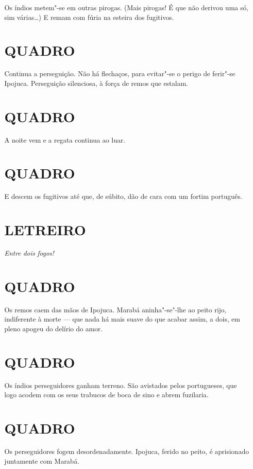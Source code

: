 Os índios metem"-se em outras pirogas. (Mais pirogas! É que não derivou
uma só, sim várias\ldots{}) E remam com fúria na esteira dos fugitivos.

\section*{QUADRO}

Continua a perseguição. Não há flechaços, para evitar"-se o perigo de
ferir"-se Ipojuca. Perseguição silenciosa, à força de remos que estalam.

\section*{QUADRO}

A noite vem e a regata continua ao luar.

\section*{QUADRO}

E descem os fugitivos até que, de súbito, dão de cara com um fortim
português.

\section*{LETREIRO}

\emph{Entre dois fogos!}

\section*{QUADRO}

Os remos caem das mãos de Ipojuca. Marabá aninha"-se"-lhe ao peito rijo,
indiferente à morte --- que nada há mais suave do que acabar assim, a
dois, em pleno apogeu do delírio do amor.

\section*{QUADRO}

Os índios perseguidores ganham terreno. São avistados pelos portugueses,
que logo acodem com os seus trabucos de boca de sino e abrem fuzilaria.

\section*{QUADRO}

Os perseguidores fogem desordenadamente. Ipojuca, ferido no peito, é
aprisionado juntamente com Marabá.

